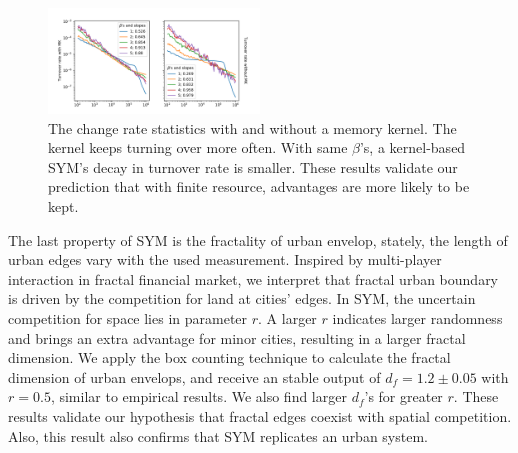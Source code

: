 \documentclass[reprint,unsortedaddress,amsmath,amssymb,aps,prl,showkeys]{revtex4-2}
\begin{document}
\begin{figure}
	\centering
	\includegraphics[width = 0.5\textwidth]{sym_suggested_LD/pics/in_one_now_now.pdf}
	\caption{The change rate statistics with and without a memory kernel. The kernel keeps turning over more often. With same $\beta$'s, a kernel-based SYM's decay in turnover rate is smaller. These results validate our prediction that with finite resource, advantages are more likely to be kept.}
	\label{changerate}
\end{figure}

The last property of SYM is the fractality of urban envelop, stately, the length of urban edges vary with the used measurement. Inspired by multi-player interaction in fractal financial market\cite{PhysRevE.65.037106}, we interpret that fractal urban boundary is driven by the competition for land at cities' edges. In SYM, the uncertain competition for space lies in parameter $r$. A larger $r$ indicates larger randomness and brings an extra advantage for minor cities, resulting in a larger fractal dimension. We apply the box counting technique to calculate the fractal dimension of urban envelops, and receive an stable output of $d_f = 1.2\pm 0.05$ with $r = 0.5$, similar to empirical results\cite{batty1992form}. We also find larger $d_f$'s for greater $r$. These results validate our hypothesis that fractal edges coexist with spatial competition. Also, this result also confirms that SYM replicates an urban system.


\end{document}
